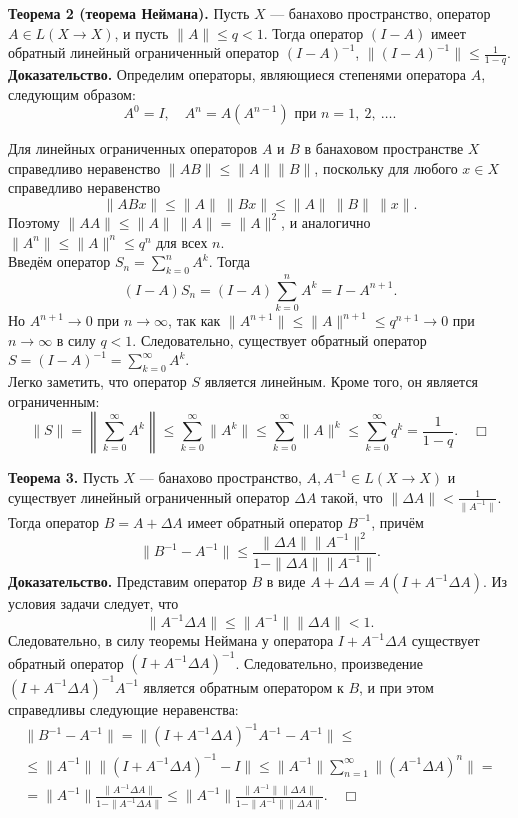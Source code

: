 \documentclass[12pt,a4paper, titlepage]{article}
\begin{document}
\textbf{Теорема 2 (теорема Неймана).} Пусть $X$ --- банахово пространство, оператор $A \in L (X \to X)$, и пусть $\|A\| \leqslant q < 1$. Тогда оператор $(I - A)$ имеет обратный линейный ограниченный оператор $(I - A)^{-1}$, $\|(I - A)^{-1}\| \leqslant \frac 1 {1-q}$.\\
\textbf{Доказательство.} Определим операторы, являющиеся степенями оператора $A$, следующим образом:
$$
A^0 = I, \quad A^n = A(A^{n-1}) \text{ при } n = 1, \ 2, \ \dots.
$$

Для линейных ограниченных операторов $A$ и $B$ в банаховом пространстве $X$ справедливо неравенство $\|AB\| \leqslant \|A\|\|B\|$, поскольку для любого $x \in X$ справедливо неравенство
$$
\|ABx\| \leqslant \|A\| \ \|Bx\| \leqslant \|A\| \ \|B\| \ \|x\|. 
$$
Поэтому $\|AA\| \leqslant \|A\| \ \|A\| = \|A\|^2$, и аналогично $\|A^n\| \leqslant \|A\|^n \leqslant q^n$ для всех $n$.\\

Введём оператор $S_n = \sum\limits_{k=0}^n A^k$. Тогда
$$
(I - A)S_n = (I - A) \sum_{k=0}^n A^k  = I - A^{n+1}.
$$
Но $A^{n+1} \to 0$ при $n\to\infty$, так как $\|A^{n+1}\| \leqslant \|A\|^{n+1} \leqslant q^{n+1} \to 0$ при $n\to\infty$ в силу $q < 1$. Следовательно, существует обратный оператор $S = (I - A)^{-1} = \sum\limits_{k=0}^\infty A^k$.\\

Легко  заметить, что оператор $S$ является линейным. Кроме того, он является ограниченным:
$$
\|S\| = \left\| \sum_{k=0}^\infty A^k \right\| \leqslant \sum_{k=0}^\infty \|A^k\| \leqslant \sum_{k=0}^\infty \|A\|^k \leqslant \sum_{k=0}^\infty q^k = \frac 1 {1 - q}. \quad \Box
$$

\textbf{Теорема 3.} Пусть $X$ --- банахово пространство, $A, A^{-1} \in L(X\to X)$ и существует линейный ограниченный оператор $\Delta A$ такой, что $ \|\Delta A\| < \frac 1 {\|A^{-1}\|}$. Тогда оператор $B = A + \Delta A$ имеет обратный оператор $B^{-1}$, причём 
$$
\|B^{-1} - A^{-1}\| \leqslant \frac {\|\Delta A\| \|A^{-1}\|^2} {1 - \|\Delta A\| \|A^{-1}\|}.
$$
\textbf{Доказательство.} Представим оператор $B$ в виде $A + \Delta A = A(I + A^{-1} \Delta A)$. Из условия задачи следует, что
$$
\|A^{-1} \Delta A\| \leqslant \|A^{-1}\| \|\Delta A\| < 1.
$$
Следовательно, в силу теоремы Неймана у оператора $I + A^{-1} \Delta A$ существует обратный оператор $(I + A^{-1} \Delta A)^{-1}$. Следовательно, произведение $(I + A^{-1} \Delta A)^{-1} A^{-1}$ является обратным оператором к $B$, и при этом справедливы следующие неравенства:
\begin{multline*}
\|B^{-1} - A^{-1}\|  = \|(I + A^{-1} \Delta A)^{-1} A^{-1} - A^{-1}\| \leqslant \\
\leqslant \|A^{-1}\| \|(I + A^{-1} \Delta A)^{-1} - I\| \leqslant
\|A^{-1}\| \sum_{n=1}^\infty \|(A^{-1} \Delta A)^n \| = \\
= \|A^{-1}\| \frac{\|A^{-1}\Delta A\|} {1 - \|A^{-1}\Delta A\| } \leqslant
\|A^{-1}\| \frac{\|A^{-1}\|\|\Delta A\|} {1 - \|A^{-1}\| \|\Delta A\| }. \quad \Box
\end{multline*}
\end{document}
